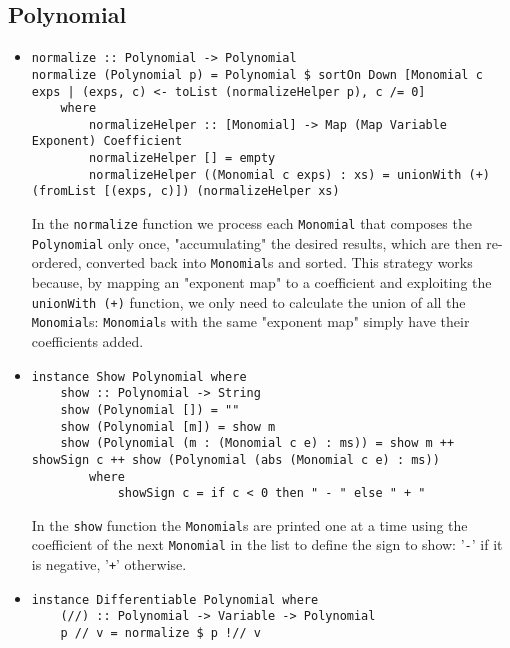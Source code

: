 \documentclass[11pt,a4paper]{article}
\begin{document}
\subsection{Polynomial}

\begin{itemize}
    \item \begin{lstlisting}
normalize :: Polynomial -> Polynomial
normalize (Polynomial p) = Polynomial $ sortOn Down [Monomial c exps | (exps, c) <- toList (normalizeHelper p), c /= 0]
    where
        normalizeHelper :: [Monomial] -> Map (Map Variable Exponent) Coefficient
        normalizeHelper [] = empty
        normalizeHelper ((Monomial c exps) : xs) = unionWith (+) (fromList [(exps, c)]) (normalizeHelper xs)    
    \end{lstlisting}

          In the \lstinline{normalize} function we process each \lstinline{Monomial} that composes the \lstinline{Polynomial} only once, "accumulating" the desired results, which are then re-ordered, converted back into \lstinline{Monomial}s and sorted. This strategy works because, by mapping an "exponent map" to a coefficient and exploiting the \lstinline{unionWith (+)} function, we only need to calculate the union of all the \lstinline{Monomial}s: \lstinline{Monomial}s with the same "exponent map" simply have their coefficients added.

    \item \begin{lstlisting}
instance Show Polynomial where
    show :: Polynomial -> String
    show (Polynomial []) = ""
    show (Polynomial [m]) = show m
    show (Polynomial (m : (Monomial c e) : ms)) = show m ++ showSign c ++ show (Polynomial (abs (Monomial c e) : ms))
        where
            showSign c = if c < 0 then " - " else " + "
    \end{lstlisting}

          In the \lstinline{show} function the \lstinline{Monomial}s are printed one at a time using the coefficient of the next \lstinline{Monomial} in the list to define the sign to show: '\lstinline{-}' if it is negative, '\lstinline{+}' otherwise.

    \item \begin{lstlisting}
instance Differentiable Polynomial where
    (//) :: Polynomial -> Variable -> Polynomial
    p // v = normalize $ p !// v
    \end{lstlisting}


\end{itemize}
\end{document}
